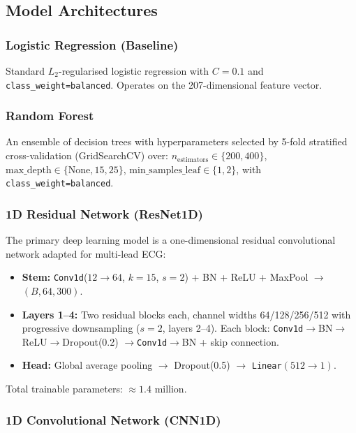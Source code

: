\documentclass[journal, 10pt, twoside]{IEEEtran}
\begin{document}
\subsection{Model Architectures}

\subsubsection{Logistic Regression (Baseline)}
Standard $L_2$-regularised logistic regression with $C = 0.1$
and \texttt{class\_weight=balanced}.
Operates on the 207-dimensional feature vector.

\subsubsection{Random Forest}
An ensemble of decision trees with hyperparameters selected by
5-fold stratified cross-validation (GridSearchCV) over:
$n_\text{estimators} \in \{200, 400\}$,
$\text{max\_depth} \in \{\text{None}, 15, 25\}$,
$\text{min\_samples\_leaf} \in \{1, 2\}$,
with \texttt{class\_weight=balanced}.

\subsubsection{1D Residual Network (ResNet1D)}

The primary deep learning model is a one-dimensional residual
convolutional network \cite{he2016deep} adapted for multi-lead ECG:

\begin{itemize}
  \item \textbf{Stem:} \texttt{Conv1d}($12 \to 64$, $k=15$, $s=2$)
        + BN + ReLU + MaxPool $\to$ $(B, 64, 300)$.
  \item \textbf{Layers 1--4:} Two residual blocks each, channel widths
        64/128/256/512 with progressive downsampling ($s=2$, layers 2--4).
        Each block: \texttt{Conv1d}$\to$BN$\to$ReLU$\to$Dropout(0.2)
        $\to$\texttt{Conv1d}$\to$BN + skip connection.
  \item \textbf{Head:} Global average pooling $\to$ Dropout(0.5) $\to$
        \texttt{Linear}$(512 \to 1)$.
\end{itemize}

Total trainable parameters: $\approx 1.4$ million.

\subsubsection{1D Convolutional Network (CNN1D)}
\end{document}
